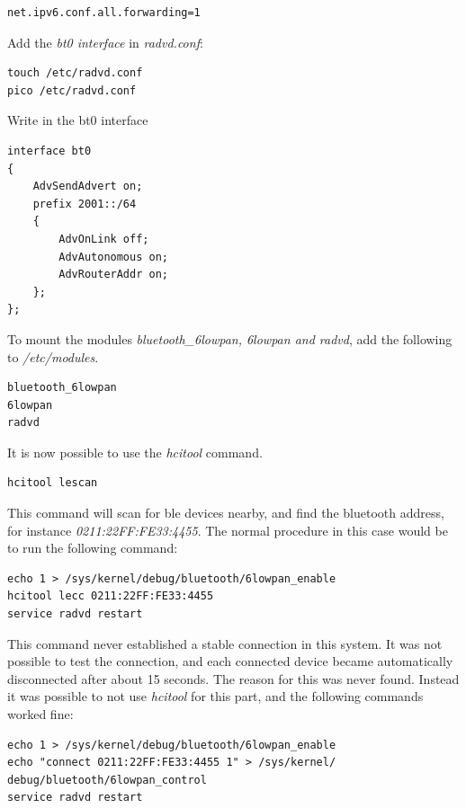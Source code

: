 \begin{verbatim}
net.ipv6.conf.all.forwarding=1
\end{verbatim}

Add the \textit{bt0 interface} in \textit{radvd.conf}:

\begin{verbatim}
touch /etc/radvd.conf
pico /etc/radvd.conf
\end{verbatim} 

Write in the bt0 interface

\begin{verbatim}
interface bt0
{
    AdvSendAdvert on;
    prefix 2001::/64
    {
        AdvOnLink off;
        AdvAutonomous on;
        AdvRouterAddr on;
    };
};
\end{verbatim} 

To mount the modules \textit{bluetooth\_6lowpan, 6lowpan and radvd}, add the following to \textit{/etc/modules}. 

\begin{verbatim}
bluetooth_6lowpan
6lowpan
radvd
\end{verbatim}

It is now possible to use the \textit{hcitool} command. 

\begin{verbatim}
hcitool lescan
\end{verbatim}

This command will scan for \gls{ble} devices nearby, and find the bluetooth address, for instance \textit{0211:22FF:FE33:4455}. The normal procedure in this case would be to run the following command: 

\begin{verbatim}
echo 1 > /sys/kernel/debug/bluetooth/6lowpan_enable
hcitool lecc 0211:22FF:FE33:4455
service radvd restart
\end{verbatim}

This command never established a stable connection in this system. It was not possible to test the connection, and each connected device became automatically disconnected after about 15 seconds. The reason for this was never found. Instead it was possible to not use \textit{hcitool} for this part, and the following commands worked fine:

\begin{verbatim}
echo 1 > /sys/kernel/debug/bluetooth/6lowpan_enable
echo "connect 0211:22FF:FE33:4455 1" > /sys/kernel/
debug/bluetooth/6lowpan_control
service radvd restart
\end{verbatim} 


